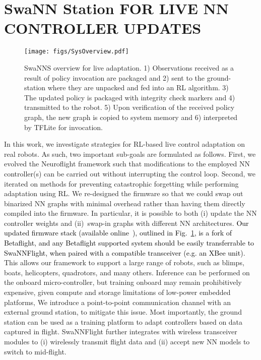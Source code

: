 \documentclass[letterpaper, 10 pt, conference]{ieeeconf} %
\newcommand{\firmware}{SwaNNFlight}
\newcommand{\framework}{SwaNNS}
\newcommand{\frameworklong}{SwaNN Station}
\newcommand{\rev}[1]{\textcolor{black}{#1}}
\begin{document}
\section{\frameworklong{} FOR LIVE NN CONTROLLER UPDATES}\label{sec:firmware}
    \begin{figure}[h]
        \centering
        \texttt{[image: figs/SysOverview.pdf]}
        \caption{\framework{} overview for live adaptation. 1) Observations received as a result of policy invocation are packaged and 2) sent to the ground-station where they are unpacked and fed into an RL algorithm. 3) The updated policy is packaged with integrity check markers and 4) transmitted to the robot. 5) Upon verification of the received policy graph, the new graph is copied to system memory and 6) interpreted by TFLite for invocation. }
        \label{fig:sys_overview}
    \end{figure}
    In this work, we investigate strategies for RL-based live control adaptation on real robots. As such, two important sub-goals are formulated as follows. First, we evolved the Neuroflight framework such that modifications to the employed NN controller(s) can be carried out without interrupting the control loop. Second, we iterated on methods for preventing catastrophic forgetting while performing adaptation using RL.
    We re-designed the firmware so that we could swap out binarized NN graphs with minimal overhead rather than having them directly compiled into the firmware.
    In particular, it is possible to both (i) update the NN controller weights and (ii)~swap-in graphs with different NN architectures.
    \rev{Our updated firmware stack (available online~\cite{supplementary}), outlined in Fig.~\ref{fig:sys_overview}, is a fork of Betaflight, and any Betaflight supported system should be easily transferrable to \firmware, when paired with a compatible transceiver (e.g. an XBee unit).} %
    This allows our framework to support a large range of robots, such as blimps, boats, helicopters, quadrotors, and many others.
    Inference can be performed on the onboard micro-controller, but training onboard may remain prohibitively expensive, given compute and storage limitations of low-power embedded platforms, 
    We introduce a point-to-point communication channel with an external ground station, to mitigate this issue.
    Most importantly, the ground station can be used as a training platform to adapt controllers based on data captured in flight.
    \firmware{} further integrates with wireless transceiver modules to (i) wirelessly transmit flight data and (ii) accept new NN models to switch to mid-flight.
    
\end{document}
